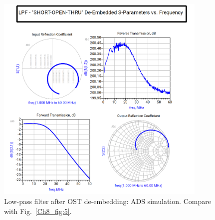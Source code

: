 \begin{figure}[H]
\centering
\includegraphics[width=0.9\textwidth]{Chapter_8/images/Lab_08_De-Embedded-SOT_ADS-Plots.png}
\caption{Low-pass filter after OST de-embedding: ADS simulation. Compare with Fig.~\ref{Ch8_fig:5}.}
\label{Ch8_fig:10}
\end{figure}

